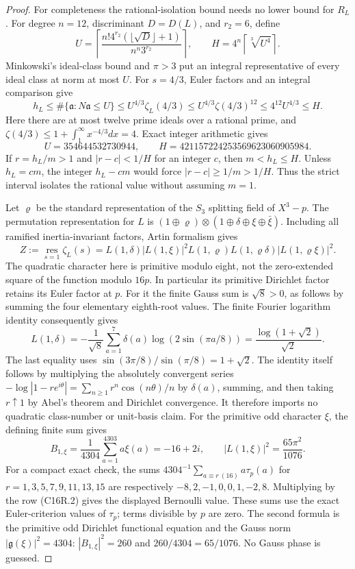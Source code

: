 \begin{proof}
For completeness the rational-isolation bound needs no lower
bound for $R_L$.  For degree $n=12$, discriminant $D=D(L)$,
and $r_2=6$, define
\[
 U=\left\lceil\frac{n!4^{r_2}(\lfloor\sqrt D\rfloor+1)}
                              {n^n3^{r_2}}\right\rceil,
 \qquad H=4^n\left\lceil\sqrt[3]{U^4}\right\rceil.
 \tag{C16R.14}
\]
Minkowski's ideal-class bound and $\pi>3$ put an integral
representative of every ideal class at norm at most $U$.
For $s=4/3$, Euler factors and an integral comparison give
\[
 h_L\le\#\{\mathfrak a:N\mathfrak a\le U\}
 \le U^{4/3}\zeta_L(4/3)
 \le U^{4/3}\zeta(4/3)^{12}\le4^{12}U^{4/3}\le H.
 \tag{C16R.15}
\]
Here there are at most twelve prime ideals over a rational prime,
and $\zeta(4/3)\le1+\int_1^\infty x^{-4/3}dx=4$.
Exact integer arithmetic gives
\[
 U=354644532730944,\qquad H=421157224253569623060905984.
 \tag{C16R.16}
\]
If $r=h_L/m>1$ and $|r-c|<1/H$ for an integer $c$, then
$m<h_L\le H$.  Unless $h_L=cm$, the integer $h_L-cm$ would
force $|r-c|\ge1/m>1/H$.  Thus the strict interval isolates the
rational value without assuming $m=1$.

Let $\varrho$ be the standard representation of the $S_3$ splitting
field of $X^3-p$.  The permutation representation for $L$ is
$(1\oplus\varrho)\otimes(1\oplus\delta\oplus\xi\oplus\bar\xi)$.
Including all ramified inertia-invariant factors, Artin formalism gives
\[
 Z:=\operatorname*{res}_{s=1}\zeta_L(s)
 =L(1,\delta)|L(1,\xi)|^2
       L(1,\varrho)L(1,\varrho\delta)|L(1,\varrho\xi)|^2.
 \tag{C16R.17}
\]
The quadratic character here is primitive modulo eight, not the
zero-extended square of the function modulo $16p$.  In particular
its primitive Dirichlet factor retains its Euler factor at $p$.
For it the finite Gauss sum is $\sqrt8>0$, as follows by
summing the four elementary eighth-root values.  The finite
Fourier logarithm identity consequently gives
\[
 L(1,\delta)=-\frac1{\sqrt8}\sum_{a=1}^7\delta(a)
          \log(2\sin(\pi a/8))
       =\frac{\log(1+\sqrt2)}{\sqrt2}.
 \tag{C16R.18}
\]
The last equality uses $\sin(3\pi/8)/\sin(\pi/8)=1+\sqrt2$.
The identity itself follows by multiplying the absolutely
convergent series $-\log|1-re^{i\theta}|=\sum_{n\ge1}
 r^n\cos(n\theta)/n$ by $\delta(a)$, summing, and then taking
$r\uparrow1$ by Abel's theorem and Dirichlet convergence.
It therefore imports no quadratic class-number or unit-basis claim.
For the primitive odd character $\xi$, the defining finite sum gives
\[
 B_{1,\xi}=\frac1{4304}\sum_{a=1}^{4303}a\xi(a)=-16+2i,
       \qquad |L(1,\xi)|^2=\frac{65\pi^2}{1076}.
 \tag{C16R.19}
\]
For a compact exact check, the sums
$4304^{-1}\sum_{a\equiv r\ (16)}a\tau_p(a)$ for
$r=1,3,5,7,9,11,13,15$ are respectively
$-8,2,-1,0,0,1,-2,8$.
Multiplying by the row (C16R.2) gives the displayed Bernoulli value.
These sums use the exact Euler-criterion values of $\tau_p$;
terms divisible by $p$ are zero.
The second formula is the primitive odd Dirichlet functional
equation and the Gauss norm $|\mathfrak g(\xi)|^2=4304$:
$|B_{1,\xi}|^2=260$ and $260/4304=65/1076$.
No Gauss phase is guessed.


\end{proof}
